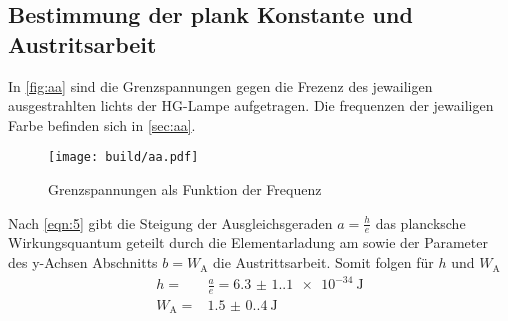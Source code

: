 \subsection{Bestimmung der plank Konstante und Austritsarbeit}
\noindent In \autoref{fig:aa} sind die Grenzspannungen gegen die 
Frezenz des jewailigen ausgestrahlten lichts der HG-Lampe aufgetragen. Die frequenzen 
der jewailigen Farbe befinden sich in \autoref{sec:aa}. 
\begin{figure}[H]
    \centering
    \caption{Grenzspannungen als Funktion der Frequenz}
    \label{fig:gelb}
    \texttt{[image: build/aa.pdf]}
\end{figure} 
\noindent Nach \autoref{eqn:5} gibt die Steigung der Ausgleichsgeraden 
$a = \frac{h}{e}$ das plancksche Wirkungsquantum geteilt durch die 
Elementarladung am sowie der Parameter des y-Achsen Abschnitts $b =  W_\text{A}$
die Austrittsarbeit. Somit folgen für $h$ und $W_\text{A}$
\begin{align}
    h =& \frac{a}{e} = \qty{6.3(1.1)e-34}{\joule}\\
    W_\text{A} =& \qty{1.5(0.4)}{\joule}
\end{align}